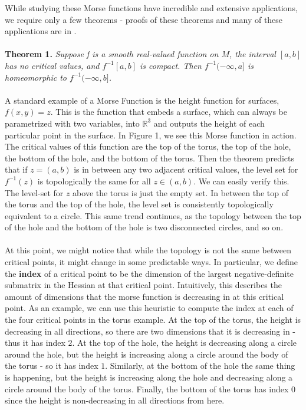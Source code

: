 \documentclass{article}
\begin{document}
While studying these Morse functions have incredible and extensive applications, we require only a few theorems - proofs of these theorems and many of these applications are in \cite{milnor}. \\ \\
\textbf{Theorem 1.} \emph{Suppose f is a smooth real-valued function on $M$, the interval $[a, b]$ has no critical values, and $f^{-1}[a, b]$ is compact. Then $f^{-1}(-\infty, a]$ is homeomorphic to $f^{-1}(-\infty, b]$.}
\\ \\
A standard example of a Morse Function is the height function for surfaces, $f(x, y) = z$. This is the function that embeds a surface, which can always be parametrized with two variables, into $\mathbb{R}^3$ and outputs the height of each particular point in the surface. In Figure 1, we see this Morse function in action. The critical values of this function are the top of the torus, the top of the hole, the bottom of the hole, and the bottom of the torus. Then the theorem predicts that if $z = (a, b)$ is in between any two adjacent critical values, the level set for $f^{-1}(z)$ is topologically the same for all $z \in (a, b)$. We can easily verify this. The level-set for $z$ above the torus is just the empty set. In between the top of the torus and the top of the hole, the level set is consistently topologically equivalent to a circle. This same trend continues, as the topology between the top of the hole and the bottom of the hole is two disconnected circles, and so on. 
\\ \\
At this point, we might notice that while the topology is not the same between critical points, it might change in some predictable ways. In particular, we define the \textbf{index} of a critical point to be the dimension of the largest negative-definite submatrix in the Hessian at that critical point. Intuitively, this describes the amount of dimensions that the morse function is decreasing in at this critical point. As an example, we can use this heuristic to compute the index at each of the four critical points in the torus example. At the top of the torus, the height is decreasing in all directions, so there are two dimensions that it is decreasing in - thus it has index $2$. At the top of the hole, the height is decreasing along a circle around the hole, but the height is increasing along a circle around the body of the torus - so it has index $1$. Similarly, at the bottom of the hole the same thing is happening, but the height is increasing along the hole and decreasing along a circle around the body of the torus. Finally, the bottom of the torus has index $0$ since the height is non-decreasing in all directions from here. 
\end{document}
